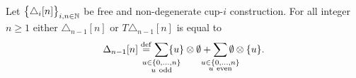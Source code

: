 %
%
%

\begin{lemma}\label{l:special case two}
	Let $\big\{ \triangle_i [n] \big\}_{i,n\in\mathbb{N}}$ be free and non-degenerate \mbox{cup-$i$} construction.
	For all integer $n \geq 1$ either $\triangle_{n-1} [n]$ or $T \triangle_{n-1} [n]$ is equal to
	\[
	\Delta_{n-1} [n] \defeq
	\sum_{\mathclap{\substack{u \in \{0,\dots,n\} \\ u \ \mathrm{odd}}}} \{u\} \ot \emptyset +
	\sum_{\mathclap{\substack{u \in \{0,\dots,n\} \\ u \ \mathrm{even}}}} \emptyset \ot \{u\}.
	\]
\end{lemma}


